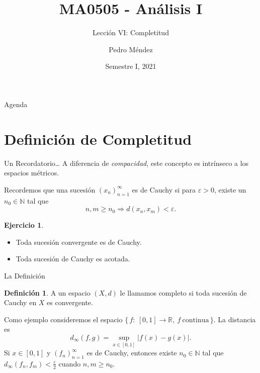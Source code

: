 \documentclass[utf8]{beamer}
\title[MA0505]{MA0505 - An\'alisis I}
\subtitle{Lecci\'on VI: Completitud}
\author{Pedro M\'endez\inst{1}}
\institute[Universidad de Costa Rica] %
{
  \inst{1}%
  Departmento de Matem\'atica Pura y Ciencias Actuariales\\
  Universidad de Costa Rica
  }
\date[I-2021] {Semestre I, 2021}
\theoremstyle{plain}
\theoremstyle{definition}
\newtheorem{Def}{Definición}           %
\newtheorem{Ej}{Ejercicio}             %
\theoremstyle{remark}
\numberwithin{equation}{section}
\newcommand{\eps}{\varepsilon}          %
\newcommand{\bN}{\mathbb{N}}    %
\newcommand{\bR}{\mathbb{R}}    %
\newcommand{\set}[1]{\{\,#1\,\}}    %
\renewcommand{\geq}{\geqslant}          %
\newcommand{\To}{\Rightarrow}
\begin{document}
\begin{frame}
  \titlepage
\end{frame}

\begin{frame}{Agenda}
  \tableofcontents
\end{frame}





\section{Definición de Completitud}

\begin{frame}{Un Recordatorio\dots}%
  A diferencia de \emph{compacidad}, este concepto es intr\'inseco a los espacios m\'etricos.\par 
  Recordemos que una sucesi\'on $(x_n)_{n=1}^\infty$ es de \alert{Cauchy} si para $\eps>0$, existe un $n_0\in\bN$ tal que 
  $$n,m\geq n_0\To d(x_n,x_m)<\eps.$$
  \begin{Ej}\label{ej:RecordatorioCauchy}
    \begin{itemize}
\item Toda sucesi\'on convergente es de Cauchy.
\item Toda sucesi\'on de Cauchy es acotada.
    \end{itemize}   
  \end{Ej}
\end{frame}

\begin{frame}{La Definición}
    \begin{Def}\label{def:EspacioCompleto}
    A un espacio $(X,d)$ le llamamos \alert{completo} si toda sucesi\'on de Cauchy en $X$ es convergente.
    \end{Def}
Como ejemplo consideremos el espacio $\set{f:\ [0,1]\to\bR,\ f\ \text{continua}}$. La distancia es
$$d_\infty(f,g)=\sup_{x\in[0,1]}|f(x)-g(x)|.$$
Si $x\in[0,1]$ y $(f_n)_{n=1}^\infty$ es de Cauchy, entonces existe $n_0\in\bN$ tal que $d_\infty(f_n,f_m)<\frac{\eps}{2}$ cuando $n,m\geq n_0$.
\end{frame}
\end{document}
